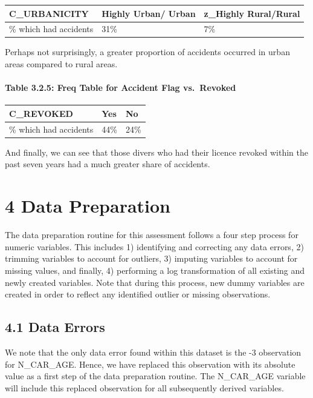 \documentclass[]{article}
\let\oldparagraph\paragraph
\renewcommand{\paragraph}[1]{\oldparagraph{#1}\mbox{}}
\begin{document}
\begin{longtable}[]{@{}lll@{}}
\toprule
C\_URBANICITY & Highly Urban/ Urban & z\_Highly
Rural/Rural\tabularnewline
\midrule
\endhead
\% which had accidents & 31\% & 7\%\tabularnewline
\bottomrule
\end{longtable}

Perhaps not surprisingly, a greater proportion of accidents occurred in
urban areas compared to rural areas.

\paragraph{Table 3.2.5: Freq Table for Accident Flag
vs.~Revoked}\label{table-3.2.5-freq-table-for-accident-flag-vs.revoked}

\begin{longtable}[]{@{}lll@{}}
\toprule
C\_REVOKED & Yes & No\tabularnewline
\midrule
\endhead
\% which had accidents & 44\% & 24\%\tabularnewline
\bottomrule
\end{longtable}

And finally, we can see that those divers who had their licence revoked
within the past seven years had a much greater share of accidents.

\section{4 Data Preparation}\label{data-preparation}

The data preparation routine for this assessment follows a four step
process for numeric variables. This includes 1) identifying and
correcting any data errors, 2) trimming variables to account for
outliers, 3) imputing variables to account for missing values, and
finally, 4) performing a log transformation of all existing and newly
created variables. Note that during this process, new dummy variables
are created in order to reflect any identified outlier or missing
observations.

\subsection{4.1 Data Errors}\label{data-errors}

We note that the only data error found within this dataset is the -3
observation for N\_CAR\_AGE. Hence, we have replaced this observation
with its absolute value as a first step of the data preparation routine.
The N\_CAR\_AGE variable will include this replaced observation for all
subsequently derived variables.
\end{document}
